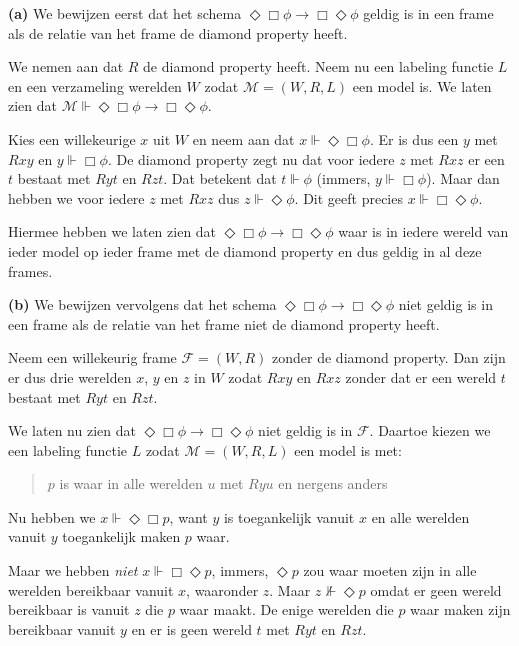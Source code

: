 \documentclass[a4paper,11pt]{article}
\begin{document}
\begin{description}

\item{\bf (a)}
We bewijzen eerst dat het schema $\Diamond \Box \phi \rightarrow \Box \Diamond \phi$ geldig
is in een frame als de relatie van het frame de diamond property heeft.

We nemen aan dat $R$ de diamond property heeft. Neem nu een labeling functie $L$ en een
verzameling werelden $W$ zodat $\mathcal{M} = (W, R, L)$ een model is. We
laten zien dat $\mathcal{M} \Vdash \Diamond \Box \phi \rightarrow \Box \Diamond \phi$.

Kies een willekeurige $x$ uit $W$ en neem aan dat $x \Vdash \Diamond \Box \phi$. Er
is dus een $y$ met $Rxy$ en $y \Vdash \Box \phi$. De diamond property zegt nu dat
voor iedere $z$ met $Rxz$ er een $t$ bestaat met $Ryt$ en $Rzt$. Dat betekent dat
$t \Vdash \phi$ (immers, $y \Vdash \Box \phi$). Maar dan hebben we voor iedere $z$ met
$Rxz$ dus $z \Vdash \Diamond \phi$. Dit geeft precies $x \Vdash \Box \Diamond \phi$.

Hiermee hebben we laten zien dat $\Diamond \Box \phi \rightarrow \Box \Diamond \phi$
waar is in iedere wereld van ieder model op ieder frame met de diamond property en dus
geldig in al deze frames.

\item{\bf (b)}
We bewijzen vervolgens dat het schema $\Diamond \Box \phi \rightarrow \Box \Diamond \phi$
niet geldig is in een frame als de relatie van het frame niet de diamond property heeft.

Neem een willekeurig frame $\mathcal{F} = (W, R)$ zonder de diamond property. Dan
zijn er dus drie werelden $x$, $y$ en $z$ in $W$ zodat $Rxy$ en $Rxz$ zonder dat er
een wereld $t$ bestaat met $Ryt$ en $Rzt$.

We laten nu zien dat $\Diamond \Box \phi \rightarrow \Box \Diamond \phi$ niet geldig is in
$\mathcal{F}$. Daartoe kiezen we een labeling functie $L$ zodat
$\mathcal{M} = (W, R, L)$ een model is met:
\begin{quote}
$p$ is waar in alle werelden $u$ met $Ryu$ en nergens anders
\end{quote}

Nu hebben we $x \Vdash \Diamond \Box p$, want $y$ is toegankelijk vanuit $x$ en alle
werelden vanuit $y$ toegankelijk maken $p$ waar.

Maar we hebben {\em niet} $x \Vdash \Box \Diamond p$, immers, $\Diamond p$ zou waar
moeten zijn in alle werelden bereikbaar vanuit $x$, waaronder $z$. Maar
$z \not \Vdash \Diamond p$ omdat er geen wereld bereikbaar is vanuit $z$ die $p$
waar maakt. De enige werelden die $p$ waar maken zijn bereikbaar vanuit $y$ en er
is geen wereld $t$ met $Ryt$ en $Rzt$.


\end{description}
\end{document}
